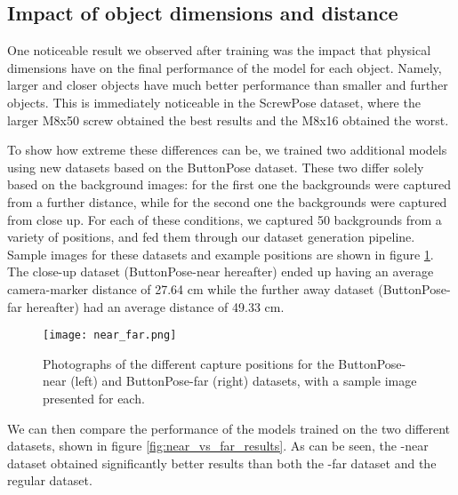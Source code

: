 \subsection{Impact of object dimensions and distance}

One noticeable result we observed after training was the impact that physical dimensions have on the final performance of the model for each object. Namely, larger and closer objects have much better performance than smaller and further objects. This is immediately noticeable in the ScrewPose dataset, where the larger M8x50 screw obtained the best results and the M8x16 obtained the worst.

To show how extreme these differences can be, we trained two additional models using new datasets based on the ButtonPose dataset. These two differ solely based on the background images: for the first one the backgrounds were captured from a further distance, while for the second one the backgrounds were captured from close up. For each of these conditions, we captured 50 backgrounds from a variety of positions, and fed them through our dataset generation pipeline. Sample images for these datasets and example positions are shown in figure \ref{fig:near_vs_far}. The close-up dataset (ButtonPose-near hereafter) ended up having an average camera-marker distance of 27.64 cm while the further away dataset (ButtonPose-far hereafter) had an average distance of 49.33 cm.

\begin{figure}[ht]
    \texttt{[image: near\_far.png]}
    \caption{Photographs of the different capture positions for the ButtonPose-near (left) and ButtonPose-far (right) datasets, with a sample image presented for each.}
    \label{fig:near_vs_far}
\end{figure}

We can then compare the performance of the models trained on the two different datasets, shown in figure \ref{fig:near_vs_far_results}. As can be seen, the -near dataset obtained significantly better results than both the -far dataset and the regular dataset.

